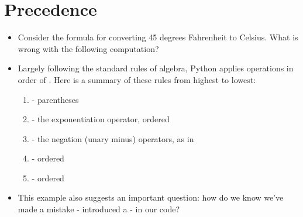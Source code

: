 \documentclass[letterpaper,10pt,english]{sphinxmanual}
\begin{document}
\section{Precedence}
\label{\detokenize{lecture_notes/lec02_calculator:precedence}}\begin{itemize}
\item {} 
Consider the formula for converting 45 degrees Fahrenheit to
Celsius. What is wrong with the following
computation?

%
\begin{sphinxVerbatim}[commandchars=\\\{\}]
      
\end{sphinxVerbatim}

\item {} 
Largely following the standard rules of algebra, Python applies
operations in order of .  Here is a
summary of these rules from highest to lowest:
\begin{enumerate}
\item {} 
\sphinxcode{\sphinxupquote{( )}} - parentheses

\item {} 
\sphinxcode{\sphinxupquote{**}} - the exponentiation operator, ordered 

\item {} 
\sphinxcode{\sphinxupquote{-}} - the negation (unary minus) operators, as in 

\item {} 
\sphinxcode{\sphinxupquote{*, /, //, \%}} - ordered 

\item {} 
\sphinxcode{\sphinxupquote{+, -}} - ordered 

\end{enumerate}

\item {} 
This example also suggests an important question:  how do we know
we’ve made a mistake - introduced a  - in our code?

\end{itemize}
\end{document}
